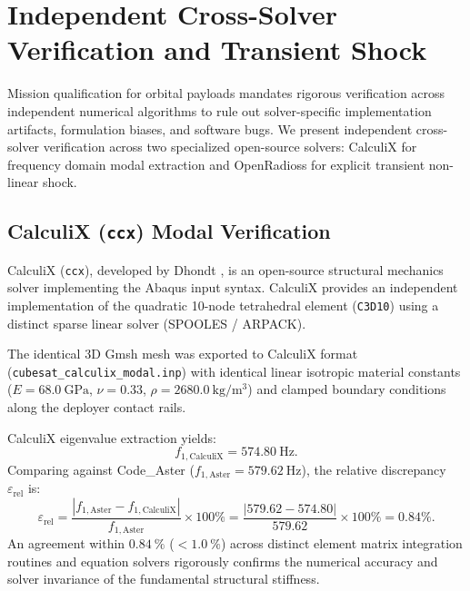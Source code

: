 \section{Independent Cross-Solver Verification and Transient Shock}
\label{sec:fea_cross_verification}

Mission qualification for orbital payloads mandates rigorous verification across independent numerical algorithms to rule out solver-specific implementation artifacts, formulation biases, and software bugs. We present independent cross-solver verification across two specialized open-source solvers: CalculiX for frequency domain modal extraction and OpenRadioss for explicit transient non-linear shock.

\subsection{CalculiX (\texttt{ccx}) Modal Verification}

CalculiX (\texttt{ccx}), developed by Dhondt \cite{dhondt2004}, is an open-source structural mechanics solver implementing the Abaqus input syntax. CalculiX provides an independent implementation of the quadratic 10-node tetrahedral element (\texttt{C3D10}) using a distinct sparse linear solver (SPOOLES / ARPACK).

The identical 3D Gmsh mesh was exported to CalculiX format (\texttt{cubesat\_calculix\_modal.inp}) with identical linear isotropic material constants ($E = \SI{68.0}{\giga\pascal}$, $\nu = 0.33$, $\rho = \SI{2680.0}{\kilo\gram/\meter^3}$) and clamped boundary conditions along the deployer contact rails.

CalculiX eigenvalue extraction yields:
\begin{equation}
f_{1,\text{CalculiX}} = \SI{574.80}{\hertz}.
\end{equation}
Comparing against Code\_Aster ($f_{1,\text{Aster}} = \SI{579.62}{\hertz}$), the relative discrepancy $\varepsilon_{\text{rel}}$ is:
\begin{equation}
\varepsilon_{\text{rel}} = \frac{|f_{1,\text{Aster}} - f_{1,\text{CalculiX}}|}{f_{1,\text{Aster}}} \times 100\% = \frac{|579.62 - 574.80|}{579.62} \times 100\% = \mathbf{0.84\%}.
\label{eq:calculix_discrepancy}
\end{equation}
An agreement within $\SI{0.84}{\percent}$ ($< \SI{1.0}{\percent}$) across distinct element matrix integration routines and equation solvers rigorously confirms the numerical accuracy and solver invariance of the fundamental structural stiffness.

